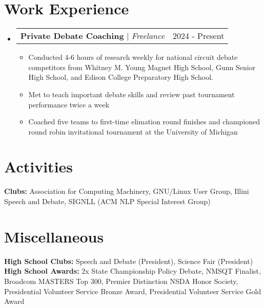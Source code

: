 \documentclass{article}
\makeatletter
\newcommand{\resumeItem}[1]{
  \item\small{
    {#1 \vspace{-2pt}}
  }
}
\newcommand{\resumeProjectHeading}[2]{
    \item
    \begin{tabular*}{0.97\textwidth}{l@{\extracolsep{\fill}}r}
      \small#1 & #2 \\
    \end{tabular*}\vspace{-7pt}
}
\newcommand{\resumeSubHeadingListStart}{\begin{itemize}[leftmargin=0.15in, label={}]}
\newcommand{\resumeSubHeadingListEnd}{\end{itemize}}
\newcommand{\resumeItemListStart}{\begin{itemize}}
\newcommand{\resumeItemListEnd}{\end{itemize}\vspace{-5pt}}
\makeatother
\begin{document}
\section{Work Experience}
\resumeSubHeadingListStart
\resumeProjectHeading
{\textbf{Private Debate Coaching} $|$ \footnotesize\emph{Freelance}}{2024 - Present}
\resumeItemListStart
\resumeItem{Conducted 4-6 hours of research weekly for national circuit debate competitors from Whitney M. Young Magnet High School, Gunn Senior High School, and Edison College Preparatory High School.}
\resumeItem{Met to teach important debate skills and review past tournament performance twice a week}
\resumeItem{Coached five teams to first-time elimation round finishes and championed round robin invitational tournament at the University of Michigan}
\resumeItemListEnd
\resumeSubHeadingListEnd

\vspace{-10pt}
\section{Activities}
\begin{itemize}[leftmargin=0.15in, label={}]
	\small{\item{
		            \textbf{Clubs: }{Association for Computing Machinery, GNU/Linux User Group, Illini Speech and Debate, SIGNLL (ACM NLP Special Interest Group)}\\

		      }}
\end{itemize}
\vspace{-10pt}
\section{Miscellaneous}
\begin{itemize}[leftmargin=0.15in, label={}]
	\small{\item{

		            \textbf{High School Clubs: }{Speech and Debate (President), Science Fair (President)} \\

		            \textbf{High School Awards: }{2x State Championship Policy Debate, NMSQT Finalist, Broadcom MASTERS Top 300, Premier Distinction NSDA Honor Society, Presidential Volunteer Service Bronze Award, Presidential Volunteer Service Gold Award}\\
		     }}
\end{itemize}
\end{document}
